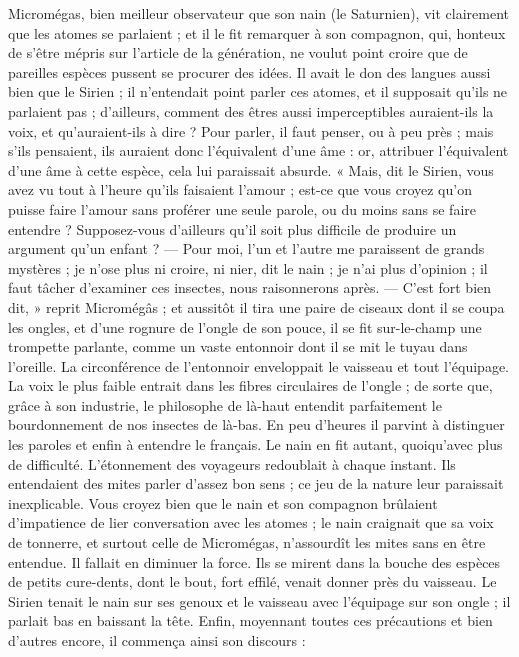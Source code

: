 \documentclass[a4paper, 11pt, oneside]{article}
\begin{document}
Micromégas, bien meilleur observateur que son nain (le Saturnien), vit clairement que les atomes se parlaient ; et il le fit remarquer à son compagnon, qui, honteux de s'être mépris sur l'article de la génération, ne voulut point croire que de pareilles espèces pussent se procurer des idées. Il avait le don des langues aussi bien que le Sirien ; il n'entendait point parler ces atomes, et il supposait qu'ils ne parlaient pas ; d'ailleurs, comment des êtres aussi imperceptibles auraient-ils la voix, et qu'auraient-ils à dire ? Pour parler, il faut penser, ou à peu près ; mais s'ils pensaient, ils auraient donc l'équivalent d'une âme : or, attribuer l'équivalent d'une âme à cette espèce, cela lui paraissait absurde. « Mais, dit le Sirien, vous avez vu tout à l'heure qu'ils faisaient l'amour ; est-ce que vous croyez qu'on puisse faire l'amour sans proférer une seule parole, ou du moins sans se faire entendre ? Supposez-vous d'ailleurs qu'il soit plus difficile de produire un argument qu'un enfant ? --- Pour moi, l'un et l'autre me paraissent de grands mystères ; je n'ose plus ni croire, ni nier, dit le nain ; je n'ai plus d'opinion ; il faut tâcher d'examiner ces insectes, nous raisonnerons après. --- C'est fort bien dit, » reprit Micromégâs ; et aussitôt il tira une paire de ciseaux dont il se coupa les ongles, et d'une rognure de l'ongle de son pouce, il se fit sur-le-champ une trompette parlante, comme un vaste entonnoir dont il se mit le tuyau dans l'oreille. La circonférence de l'entonnoir enveloppait le vaisseau et tout l'équipage. La voix le plus faible entrait dans les fibres circulaires de l'ongle ; de sorte que, grâce à son industrie, le philosophe de là-haut entendit parfaitement le bourdonnement de nos insectes de là-bas. En peu d'heures il parvint à distinguer les paroles et enfin à entendre le français. Le nain en fit autant, quoiqu'avec plus de difficulté. L'étonnement des voyageurs redoublait à chaque instant. Ils entendaient des mites parler d'assez bon sens ; ce jeu de la nature leur paraissait inexplicable. Vous croyez bien que le nain et son compagnon brûlaient d'impatience de lier conversation avec les atomes ; le nain craignait que sa voix de tonnerre, et surtout celle de Micromégas, n'assourdît les mites sans en être entendue. Il fallait en diminuer la force. Ils se mirent dans la bouche des espèces de petits cure-dents, dont le bout, fort effilé, venait donner près du vaisseau. Le Sirien tenait le nain sur ses genoux et le vaisseau avec l'équipage sur son ongle ; il parlait bas en baissant la tête. Enfin, moyennant toutes ces précautions et bien d'autres encore, il commença ainsi son discours :
\end{document}
